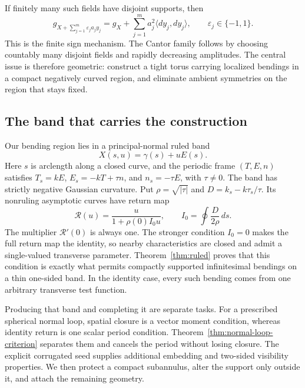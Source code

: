 \documentclass[11pt]{amsart}
\theoremstyle{definition}
\theoremstyle{remark}
\numberwithin{equation}{section}
\begin{document}
If finitely many such fields have disjoint supports, then
\[
 g_{X+\sum_{j=1}^m\varepsilon_j a_jy_j}
 =g_X+\sum_{j=1}^m a_j^2\langle dy_j,dy_j\rangle,
 \qquad \varepsilon_j\in\{-1,1\}.
\]
This is the finite sign mechanism. The Cantor family follows by choosing
countably many disjoint fields and rapidly decreasing amplitudes. The
central issue is therefore geometric: construct a tight torus carrying
localized bendings in a compact negatively curved region, and eliminate
ambient symmetries on the region that stays fixed.

\subsection{The band that carries the construction}
Our bending region lies in a principal-normal ruled band
\[
 X(s,u)=\gamma(s)+uE(s).
\]
Here $s$ is arclength along a closed curve, and the periodic frame
$(T,E,n)$ satisfies $T_s=kE$, $E_s=-kT+\tau n$, and $n_s=-\tau E$,
with $\tau\ne0$. The band has strictly negative Gaussian curvature.
Put $\rho=\sqrt{|\tau|}$ and $D=k_s-k\tau_s/\tau$. Its nonruling
asymptotic curves have return map
\begin{equation}\label{eq:intro-return}
 \mathcal R(u)=\frac{u}{1+\rho(0)I_0u},
 \qquad I_0=\oint\frac{D}{2\rho}\,ds.
\end{equation}
The multiplier $\mathcal R'(0)$ is always one. The stronger condition
$I_0=0$ makes the full return map the identity, so nearby characteristics
are closed and admit a single-valued transverse parameter.
Theorem~\ref{thm:ruled} proves that this condition is exactly what permits
compactly supported infinitesimal bendings on a thin one-sided band. In
the identity case, every such bending comes from one arbitrary transverse
test function.

Producing that band and completing it are separate tasks. For a prescribed
spherical normal loop, spatial closure is a vector moment condition,
whereas identity return is one scalar period condition.
Theorem~\ref{thm:normal-loop-criterion} separates them and cancels the
period without losing closure. The explicit corrugated seed supplies
additional embedding and two-sided visibility properties. We then protect
a compact subannulus, alter the support only outside it, and attach the
remaining geometry.
\end{document}
